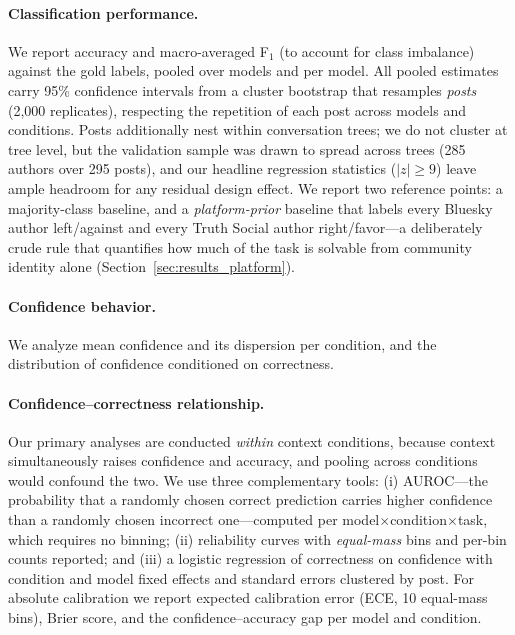 \documentclass[11pt]{article}
\begin{document}
\paragraph{Classification performance.}
We report accuracy and macro-averaged F$_1$ (to account for class imbalance) against the gold labels, pooled over models and per model. All pooled estimates carry 95\% confidence intervals from a cluster bootstrap that resamples \emph{posts} (2{,}000 replicates), respecting the repetition of each post across models and conditions. Posts additionally nest within conversation trees; we do not cluster at tree level, but the validation sample was drawn to spread across trees (285 authors over 295 posts), and our headline regression statistics ($|z| \ge 9$) leave ample headroom for any residual design effect. We report two reference points: a majority-class baseline, and a \emph{platform-prior} baseline that labels every Bluesky author left/against and every Truth Social author right/favor---a deliberately crude rule that quantifies how much of the task is solvable from community identity alone (Section~\ref{sec:results_platform}).

\paragraph{Confidence behavior.}
We analyze mean confidence and its dispersion per condition, and the distribution of confidence conditioned on correctness.

\paragraph{Confidence--correctness relationship.}
Our primary analyses are conducted \emph{within} context conditions, because context simultaneously raises confidence and accuracy, and pooling across conditions would confound the two. We use three complementary tools: (i) AUROC---the probability that a randomly chosen correct prediction carries higher confidence than a randomly chosen incorrect one---computed per model$\times$condition$\times$task, which requires no binning; (ii) reliability curves with \emph{equal-mass} bins and per-bin counts reported; and (iii) a logistic regression of correctness on confidence with condition and model fixed effects and standard errors clustered by post. For absolute calibration we report expected calibration error (ECE, 10 equal-mass bins), Brier score, and the confidence--accuracy gap per model and condition.
\end{document}
